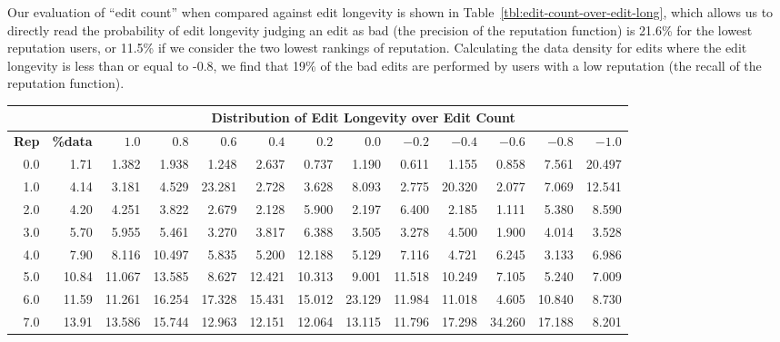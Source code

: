 


Our evaluation of ``edit count'' when compared against
edit longevity is shown in
Table~\ref{tbl:edit-count-over-edit-long},
which allows us to directly read the probability
of edit longevity judging an edit as bad
(the precision of the reputation function)
is 21.6\% for the lowest reputation users,
or 11.5\% if we consider the two lowest
rankings of reputation.
Calculating the data density for edits
where the edit longevity is less than or
equal to -0.8, we find that 19\%
of the bad edits are performed
by users with a low reputation
(the recall of the reputation function).




\iflong

\begin{table*}
\begin{center}
\begin{tabular}{|r|r||r|r|r|r|r|r|r|r|r|r|r|}
\hline
 & & \multicolumn{11}{|c|}{Distribution of Edit Longevity over Edit Count} \\
 \hline
\textbf{Rep}   & \textbf{\%data}
& \textbf{$1.0$} & \textbf{$0.8$}   & \textbf{$0.6$}   & \textbf{$0.4$}   & \textbf{$0.2$}   & \textbf{$0.0$}   & \textbf{$-0.2$}  & \textbf{$-0.4$} & \textbf{$-0.6$}   & \textbf{$-0.8$}  & \textbf{$-1.0$}\\
\hline
\hline
0.0   &  1.71   &   1.382 &  1.938 &  1.248 &  2.637 &  0.737 &  1.190 &  0.611 &  1.155 &  0.858 &  7.561 & 20.497 \\
1.0   &  4.14   &   3.181 &  4.529 & 23.281 &  2.728 &  3.628 &  8.093 &  2.775 & 20.320 &  2.077 &  7.069 & 12.541 \\
2.0   &  4.20   &   4.251 &  3.822 &  2.679 &  2.128 &  5.900 &  2.197 &  6.400 &  2.185 &  1.111 &  5.380 &  8.590 \\
3.0   &  5.70   &   5.955 &  5.461 &  3.270 &  3.817 &  6.388 &  3.505 &  3.278 &  4.500 &  1.900 &  4.014 &  3.528 \\
4.0   &  7.90   &   8.116 & 10.497 &  5.835 &  5.200 & 12.188 &  5.129 &  7.116 &  4.721 &  6.245 &  3.133 &  6.986 \\
5.0   &  10.84  &  11.067 & 13.585 &  8.627 & 12.421 & 10.313 &  9.001 & 11.518 & 10.249 &  7.105 &  5.240 &  7.009 \\
6.0   &  11.59  &  11.261 & 16.254 & 17.328 & 15.431 & 15.012 & 23.129 & 11.984 & 11.018 &  4.605 & 10.840 &  8.730 \\
7.0   &  13.91  &  13.586 & 15.744 & 12.963 & 12.151 & 12.064 & 13.115 & 11.796 & 17.298 & 34.260 & 17.188 &  8.201 \\

\end{tabular}
\end{center}
\end{table*}
